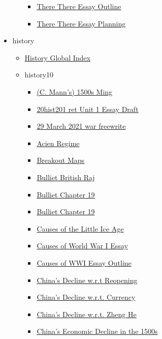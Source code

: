 \documentclass[11pt]{article}
\begin{document}
\begin{itemize}
\begin{itemize}
\begin{itemize}
\item \href{english/english11/KBdThereThereEssayOutline.org}{There There Essay Outline}
\item \href{english/english11/KBxThereThereEssayPlanning.org}{There There Essay Planning}
\end{itemize}
\end{itemize}
\item history
\begin{itemize}
\item \href{history/index.org}{History Global Index}
\item history10
\begin{itemize}
\item \href{history/history10/KBhHIST201MannMing.org}{(C. Mann's) 1500s Ming}
\item \href{history/history10/KBe20hist201retUnit1EssayDraft.org}{20hist201 ret Unit 1 Essay Draft}
\item \href{history/history10/KBe21hist201retFreewriteWar.org}{29 March 2021 war freewrite}
\item \href{history/history10/KBhHIST201AcienRegime.org}{Acien Regime}
\item \href{history/history10/KB20200826093400.org}{Breakout Maps}
\item \href{history/history10/KBhHIST201BritishRaj.org}{Bulliet British Raj}
\item \href{history/history10/KBBullietCh19.org}{Bulliet Chapter 19}
\item \href{history/history10/KBhHIST201BullietCh19.org}{Bulliet Chapter 19}
\item \href{history/history10/KBhHIST201TheoriesOfLittleIceAge.org}{Causes of the Little Ice Age}
\item \href{history/history10/KBe21hist201retCausesOfWWIEssay.org}{Causes of World War I Essay}
\item \href{history/history10/KBe21hist201floCausesOfWWIEssayOutline.org}{Causes of WWI Essay Outline}
\item \href{history/history10/KBhHIST201ChinasDeclineWRTReopening.org}{China's Decline w.r.t Reopening}
\item \href{history/history10/KBhHIST201ChinasDeclineWRTCurrency.org}{China's Decline w.r.t. Currency}
\item \href{history/history10/KBhHIST201ChinasDeclineWRTZhengHe.org}{China's Decline w.r.t. Zheng He}
\item \href{history/history10/KBhHIST201ChinasDecline1500.org}{China's Economic Decline in the 1500s}

\end{itemize}
\end{itemize}
\end{itemize}
\end{document}
